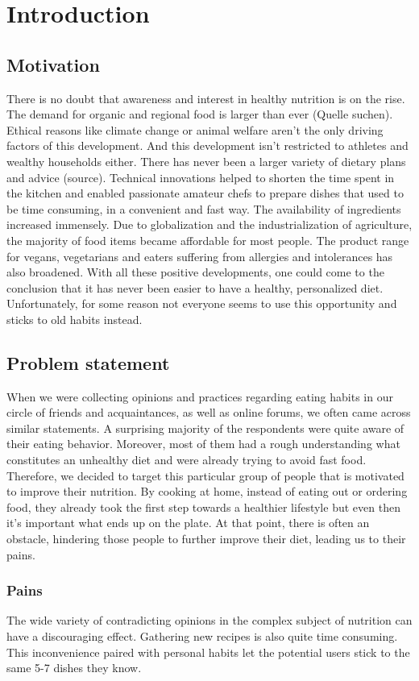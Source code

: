 \chapter{Introduction}
\section{Motivation}
There is no doubt that awareness and interest in healthy nutrition is on the rise. The demand for organic and regional food is larger than ever (Quelle suchen). Ethical reasons like climate change or animal welfare aren’t the only driving factors of this development. And this development isn’t restricted to athletes and wealthy households either. There has never been a larger variety of dietary plans and advice (source). Technical innovations helped to shorten the time spent in the kitchen and enabled passionate amateur chefs to prepare dishes that used to be time consuming, in a convenient and fast way. The availability of ingredients increased immensely. Due to globalization and the industrialization of agriculture, the majority of food items became affordable for most people. The product range for vegans, vegetarians and eaters suffering from allergies and intolerances has also broadened. With all these positive developments, one could come to the conclusion that it has never been easier to have a healthy, personalized diet. Unfortunately, for some reason not everyone seems to use this opportunity and sticks to old habits instead.
\section{Problem statement}
When we were collecting opinions and practices regarding eating habits in our circle of friends and acquaintances, as well as online forums, we often came across similar statements. A surprising majority of the respondents were quite aware of their eating behavior. Moreover, most of them had a rough understanding what constitutes an unhealthy diet and were already trying to avoid fast food. Therefore, we decided to target this particular group of people that is motivated to improve their nutrition. By cooking at home, instead of eating out or ordering food, they already took the first step towards a healthier lifestyle but even then it’s important what ends up on the plate. At that point, there is often an obstacle, hindering those people to further improve their diet, leading us to their  pains.

\subsection{Pains}
The wide variety of contradicting opinions in the complex subject of nutrition can have a discouraging effect. Gathering new recipes is also quite time consuming. This inconvenience paired with personal habits let the potential users stick to the same 5-7 dishes they know.

